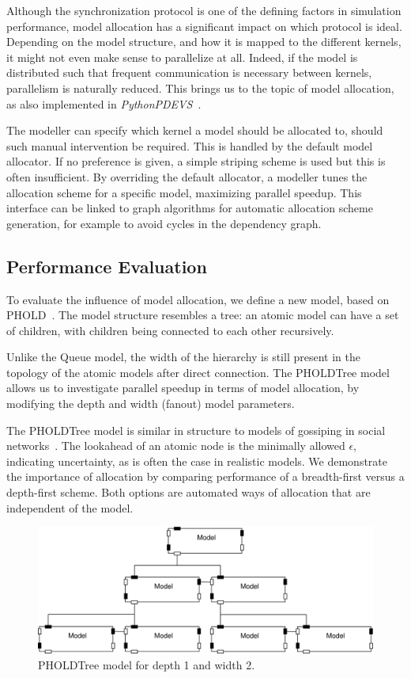 Although the synchronization protocol is one of the defining factors in simulation performance, model allocation has a significant impact on which protocol is ideal.
Depending on the model structure, and how it is mapped to the different kernels, it might not even make sense to parallelize at all.
Indeed, if the model is distributed such that frequent communication is necessary between kernels, parallelism is naturally reduced.
This brings us to the topic of model allocation, as also implemented in \textit{PythonPDEVS}~\cite{PythonPDEVS2}.

The modeller can specify which kernel a model should be allocated to, should such manual intervention be required.
This is handled by the default model allocator.
If no preference is given, a simple striping scheme is used but this is often insufficient.
By overriding the default allocator, a modeller tunes the allocation scheme for a specific model, maximizing parallel speedup.
This interface can be linked to graph algorithms for automatic allocation scheme generation, for example to avoid cycles in the dependency graph.

\subsection{Performance Evaluation}
To evaluate the influence of model allocation, we define a new model, based on PHOLD~\cite{PHOLD}.
The model structure resembles a tree: an atomic model can have a set of children, with children being connected to each other recursively.

Unlike the Queue model, the width of the hierarchy is still present in the topology of the atomic models after direct connection.
The PHOLDTree model allows us to investigate parallel speedup in terms of model allocation, by modifying the depth and width (fanout) model parameters.

The PHOLDTree model is similar in structure to models of gossiping in social networks~\cite{Gossip}.
The lookahead of an atomic node is the minimally allowed $\epsilon$, indicating uncertainty, as is often the case in realistic models.
We demonstrate the importance of allocation by comparing performance of a breadth-first versus a depth-first scheme.
Both options are automated ways of allocation that are independent of the model.

\begin{figure}
    \center
    \includegraphics[width=\columnwidth]{fig/pholdtree.pdf}
    \caption{PHOLDTree model for depth 1 and width 2.}
    \label{fig:PHOLDTree_model}
\end{figure}

